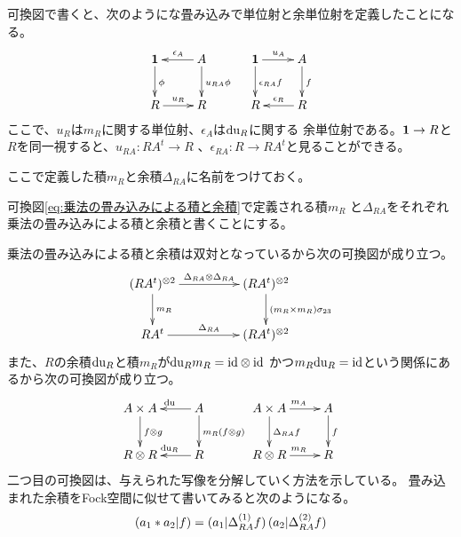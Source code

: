	可換図で書くと、次のようにな畳み込みで単位射と余単位射を定義したことになる。
	\begin{equation}\xymatrix{
		\mybf{1} \ar[d]^{\phi} & A \ar[l]_{\epsilon_A} \ar[d]^{u_{RA}\phi} \\
		R \ar[r]^{u_R} & R \\
	}\quad\xymatrix{
		\mybf{1} \ar[r]^{u_A} \ar[d]^{\epsilon_{RA}f} & A \ar[d]^{f} \\
		R & R \ar[l]_{\epsilon_R} \\
	}\end{equation}
	ここで、$u_R$は$m_R$に関する単位射、$\epsilon_A$は${\operatorname{du}}_R$に関する
	余単位射である。${\mathbf{1}}\to R$と$R$を同一視すると、$u_{RA}:RA^t\to R$
	、$\epsilon_{RA}:R\to RA^t$と見ることができる。

	ここで定義した積$m_R$と余積$\Delta_{RA}$に名前をつけておく。

	\begin{definition}[乗法の畳み込みによる積と余積]\label{def:乗法の畳み込みによる積と余積} %
		可換図\ref{eq:乗法の畳み込みによる積と余積}で定義される積$m_R$
		と$\Delta_{RA}$をそれぞれ乗法の畳み込みによる積と余積と書くことにする。
	\end{definition} %

	乗法の畳み込みによる積と余積は双対となっているから次の可換図が成り立つ。
	\begin{equation}\xymatrix@C+2pc{
		(RA^t)^{\otimes2} \ar[r]^{\Delta_{RA}\otimes \Delta_{RA}} \ar[d]^{m_R}
		& (RA^t)^{\otimes2} \ar[d]^{(m_R\times m_R)\sigma_{23}} \\
		RA^t \ar[r]^{\Delta_{RA}} & (RA^t)^{\otimes2} \\
	}\end{equation}
	また、$R$の余積${\operatorname{du}}_R$と積$m_R$が${\operatorname{du}}_R m_R={\operatorname{id}}\otimes {\operatorname{id}}$
	かつ$m_R{\operatorname{du}}_R={\operatorname{id}}$という関係にあるから次の可換図が成り立つ。
	\begin{equation}\xymatrix{
		A\times A \ar[d]^{f\otimes g} & A \ar[l]_{\mydu} \ar[d]^{m_R(f\otimes g)} \\
		R\otimes R & R \ar[l]_{\mydu_R} \\
	}\xymatrix{
		A\times A \ar[d]^{\Delta_{RA} f} \ar[r]^{m_A} & A \ar[d]^{f} \\
		R\otimes R \ar[r]^{m_R} & R  \\
	}\end{equation}
	二つ目の可換図は、与えられた写像を分解していく方法を示している。
	畳み込まれた余積をFock空間に似せて書いてみると次のようになる。
	\begin{equation*}\begin{split} %
		\obraket{a_1*a_2|f} &= \obraket{a_1|\Delta_{RA}^{(1)}f}\obraket{a_2|\Delta_{RA}^{(2)}f} \\
	\end{split}\end{equation*} %

